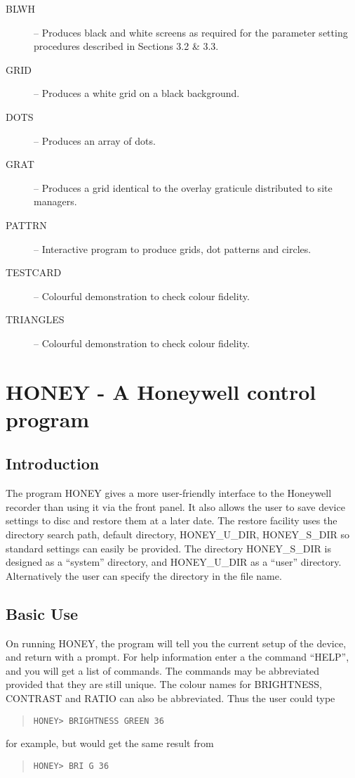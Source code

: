 \begin{description}
\item [BLWH] -- Produces black and white screens as required for
the parameter setting procedures described in Sections 3.2 \&
3.3.
\item[GRID] -- Produces a white grid on a black background.
\item[DOTS] -- Produces an array of dots.
\item[GRAT] -- Produces a grid identical to the overlay graticule
distributed to site managers.
\item[PATTRN] -- Interactive program to produce grids, dot patterns and
circles.
\item[TESTCARD] -- Colourful demonstration to check colour fidelity.
\item[TRIANGLES] -- Colourful demonstration to check colour fidelity.
\end{description}

\appendix

\section{HONEY - A Honeywell control program}

\subsection{Introduction}

The program HONEY gives a more user-friendly interface to the Honeywell
recorder than using it via the front panel. It also allows the user to
save device settings to disc and restore them at a later date. The
restore facility uses the directory search path, default directory,
HONEY\_U\_DIR, HONEY\_S\_DIR so standard settings can easily be
provided. The directory HONEY\_S\_DIR is designed as a ``system''
directory, and HONEY\_U\_DIR as a ``user'' directory. Alternatively
the user can specify the directory in the file name.

\subsection{Basic Use}

On running HONEY, the program will
tell you the current setup of the device, and return with a prompt.
For help information enter a the command ``HELP'', and you will get
a list of commands. The commands may be abbreviated provided that they
are still unique. The colour names for BRIGHTNESS, CONTRAST and RATIO
can also be abbreviated. Thus the user could type
\begin{quote}
\begin{verbatim}
HONEY> BRIGHTNESS GREEN 36
\end{verbatim}
\end{quote}
for example, but would get the same result from
\begin{quote}
\begin{verbatim}
HONEY> BRI G 36
\end{verbatim}
\end{quote}

